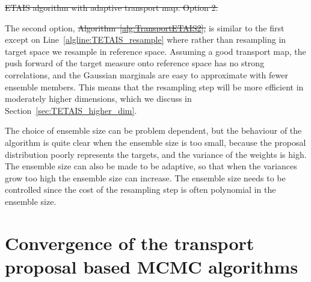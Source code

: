 \documentclass[final]{siamltex}
\newcommand{\edit}[1]{{\color{red} #1}}  %
\providecommand{\DIFdel}[1]{{\protect\color{red}\sout{#1}}}                      %
\providecommand{\DIFaddbegin}{} %
\providecommand{\DIFaddend}{} %
\providecommand{\DIFdelbegin}{} %
\providecommand{\DIFdelend}{} %
\providecommand{\DIFdelFL}[1]{\DIFdel{#1}} %
\newcommand{\DIFscaledelfig}{0.5}
\newlength{\DIFdelgraphicswidth} %
\newlength{\DIFdelgraphicsheight} %
\newcommand{\DIFaddincludegraphics}[2][]{{\color{blue}\fbox{\DIFOincludegraphics[#1]{#2}}}} %
\newcommand{\DIFdelincludegraphics}[2][]{%
\sbox{\DIFdelgraphicsbox}{\DIFOincludegraphics[#1]{#2}}%
\settoboxwidth{\DIFdelgraphicswidth}{\DIFdelgraphicsbox} %
\settoboxtotalheight{\DIFdelgraphicsheight}{\DIFdelgraphicsbox} %
\scalebox{\DIFscaledelfig}{%
\parbox[b]{\DIFdelgraphicswidth}{\usebox{\DIFdelgraphicsbox}\\[-\baselineskip] \rule{\DIFdelgraphicswidth}{0em}}\llap{\resizebox{\DIFdelgraphicswidth}{\DIFdelgraphicsheight}{%
\setlength{\unitlength}{\DIFdelgraphicswidth}%
\begin{picture}(1,1)%
\thicklines\linethickness{2pt} %
{\color[rgb]{1,0,0}\put(0,0){\framebox(1,1){}}}%
{\color[rgb]{1,0,0}\put(0,0){\line( 1,1){1}}}%
{\color[rgb]{1,0,0}\put(0,1){\line(1,-1){1}}}%
\end{picture}%
}\hspace*{3pt}}} %
} %
\DeclareRobustCommand{\DIFaddbegin}{\DIFOaddbegin \let\includegraphics\DIFaddincludegraphics} %
\DeclareRobustCommand{\DIFaddend}{\DIFOaddend \let\includegraphics\DIFOincludegraphics} %
\DeclareRobustCommand{\DIFdelbegin}{\DIFOdelbegin \let\includegraphics\DIFdelincludegraphics} %
\DeclareRobustCommand{\DIFdelend}{\DIFOaddend \let\includegraphics\DIFOincludegraphics} %
\begin{document}
{%
\DIFdelFL{ETAIS algorithm with adaptive transport map. Option 2.}%
}

\DIFdelend The second option, \DIFdelbegin \DIFdel{Algorithm~\ref{alg:TransportETAIS2}, }\DIFdelend is similar to
the first except on Line~\ref{algline:TETAIS_resample} where rather
than resampling in target space we resample in reference
space. Assuming a good transport map, the push forward of the target
measure onto 
reference space has no strong correlations, and the
Gaussian marginals are easy to approximate with fewer ensemble
members. This means that the resampling step will be more efficient in
moderately higher dimensions, which we discuss in
Section~\ref{sec:TETAIS_higher_dim}.

\DIFaddbegin \edit{The choice of ensemble size can be problem dependent, but the
  behaviour of the algorithm is quite clear when the ensemble size is
  too small, because the proposal distribution poorly represents the
  targets, and the variance of the weights is high. The ensemble size
  can also be made to be adaptive, so that when the variances grow too
high the ensemble size can increase. The ensemble size needs to be
controlled since the cost of the resampling step is often polynomial
in the ensemble size.}

\DIFaddend \section[Convergence of transport MCMC]{Convergence of the transport proposal based MCMC algorithms}\label{sec:conv}
\end{document}

